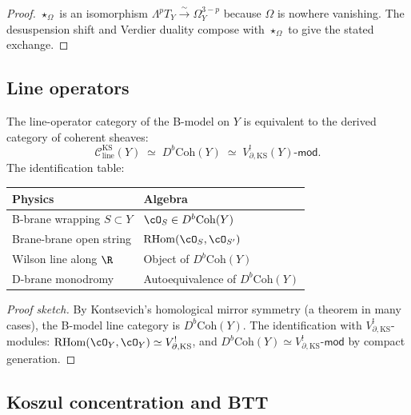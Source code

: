 \begin{proof}
$\star_\Omega$ is an isomorphism $\Lambda^p T_Y \xrightarrow{\sim}
\Omega^{3-p}_Y$ because $\Omega$ is nowhere vanishing. The
desuspension shift and Verdier duality compose with $\star_\Omega$
to give the stated exchange.
\end{proof}


\subsection{Line operators}

\begin{theorem}
\label{thm:thqg-ks-lines}
The line-operator category of the B-model on $Y$ is equivalent to the
derived category of coherent sheaves:
\begin{equation}%
\mathcal{C}_{\mathrm{line}}^{\mathrm{KS}}(Y)
\;\simeq\;
D^b \mathrm{Coh}(Y)
\;\simeq\;
V_{\partial,\mathrm{KS}}^!(Y)\text{-}\mathsf{mod}.
\end{equation}
The identification table:
\begin{center}
\renewcommand{\arraystretch}{1.2}
\small
\begin{tabular}{ll}
\textbf{Physics} & \textbf{Algebra} \\
\hline
B-brane wrapping $S \subset Y$ & $\cO_S \in D^b\mathrm{Coh}(Y)$ \\
Brane-brane open string & $\RHom(\cO_S, \cO_{S'})$ \\
Wilson line along $\R$ & Object of $D^b\mathrm{Coh}(Y)$ \\
D-brane monodromy & Autoequivalence of $D^b\mathrm{Coh}(Y)$
\end{tabular}
\end{center}
\end{theorem}

\begin{proof}[Proof sketch]
By Kontsevich's homological mirror symmetry (a theorem in many cases),
the B-model line category is $D^b\mathrm{Coh}(Y)$. The identification
with $V^!_{\partial,\mathrm{KS}}$-modules: $\RHom(\cO_Y, \cO_Y)
\simeq V^!_{\partial,\mathrm{KS}}$, and $D^b\mathrm{Coh}(Y)
\simeq V^!_{\partial,\mathrm{KS}}\text{-}\mathsf{mod}$ by compact
generation.
\end{proof}


\subsection{Koszul concentration and BTT}

